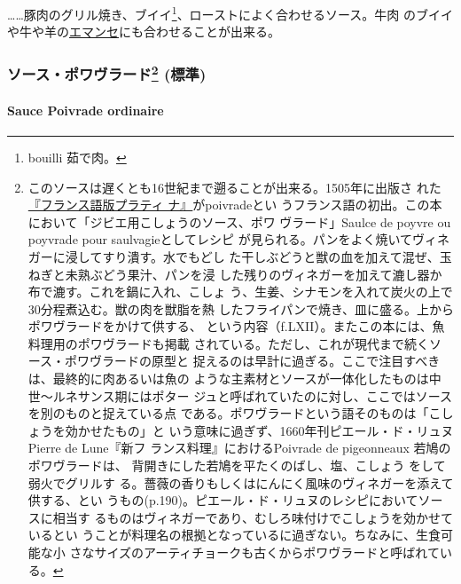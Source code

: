 \begin{recette}
\ldots{}\ldots{}豚肉のグリル焼き、ブイイ\footnote{bouilli 茹で肉。}、ローストによく合わせるソース。牛肉
のブイイや牛や羊の\protect\hyperlink{}{エマンセ}にも合わせることが出来る。

\maeaki

\hypertarget{ux30bdux30fcux30b9ux30ddux30efux30f4ux30e9ux30fcux30c9105-ux6a19ux6e96}{%
\subsubsection[ソース・ポワヴラード
(標準)]{\texorpdfstring{ソース・ポワヴラード\footnote{このソースは遅くとも16世紀まで遡ることが出来る。1505年に出版さ
  れた\href{http://gallica.bnf.fr/ark:/12148/bpt6k792720}{『フランス語版プラティ
  ナ』}がpoivradeとい
  うフランス語の初出。この本において「ジビエ用こしょうのソース、ポワ
  ヴラード」Saulce de poyvre ou poyvrade pour saulvagieとしてレシピ
  が見られる。パンをよく焼いてヴィネガーに浸してすり潰す。水でもどし
  た干しぶどうと獣の血を加えて混ぜ、玉ねぎと未熟ぶどう果汁、パンを浸
  した残りのヴィネガーを加えて漉し器か布で漉す。これを鍋に入れ、こしょ
  う、生姜、シナモンを入れて炭火の上で30分程煮込む。獣の肉を獣脂を熱
  したフライパンで焼き、皿に盛る。上からポワヴラードをかけて供する、
  という内容（f.LXII）。またこの本には、魚料理用のポワヴラードも掲載
  されている。ただし、これが現代まで続くソース・ポワヴラードの原型と
  捉えるのは早計に過ぎる。ここで注目すべきは、最終的に肉あるいは魚の
  ような主素材とソースが一体化したものは中世〜ルネサンス期にはポター
  ジュと呼ばれていたのに対し、ここではソースを別のものと捉えている点
  である。ポワヴラードという語そのものは「こしょうを効かせたもの」と
  いう意味に過ぎず、1660年刊ピエール・ド・リュヌPierre de Lune『新フ
  ランス料理』におけるPoivrade de pigeonneaux 若鳩のポワヴラードは、
  背開きにした若鳩を平たくのばし、塩、こしょう をして弱火でグリルす
  る。薔薇の香りもしくはにんにく風味のヴィネガーを添えて供する、とい
  うもの(p.190)。ピエール・ド・リュヌのレシピにおいてソースに相当す
  るものはヴィネガーであり、むしろ味付けでこしょうを効かせているとい
  うことが料理名の根拠となっているに過ぎない。ちなみに、生食可能な小
  さなサイズのアーティチョークも古くからポワヴラードと呼ばれている。}
(標準)}{ソース・ポワヴラード (標準)}}\label{ux30bdux30fcux30b9ux30ddux30efux30f4ux30e9ux30fcux30c9105-ux6a19ux6e96}}

\hypertarget{sauce-poivrade}{%
\paragraph{Sauce Poivrade ordinaire}\label{sauce-poivrade}}


\end{recette}
